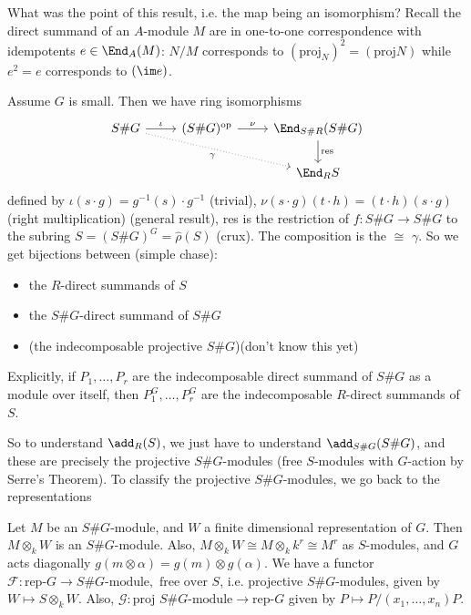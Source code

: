 What was the point of this result, i.e. the map being an isomorphism? Recall the direct summand of an $A$-module $M$ are in one-to-one correspondence with idempotents $e \in \End_A(M)$: $N/M$ corresponds to $(\text{proj}_N)^2= (\text{proj}N)$ while $e^2=e$ corresponds to $(\im e)$. 


\begin{cor}
Assume $G$ is small. Then we have ring isomorphisms 
	\[
	\begin{tikzcd}
	S\#G \arrow{r}{\iota} \arrow[dotted,swap]{rrd}{\gamma} & (S\#G)^{\text{op}} \arrow{r}{\nu} & \End_{S\#R}(S\#G) \arrow{d}{\text{res}} \\
	& & \End_R S
	\end{tikzcd}
	\]
defined by $\iota(s \cdot g)= g^{-1}(s) \cdot g^{-1}$ (trivial), $\nu(s \cdot g)(t \cdot h)= (t \cdot h)(s \cdot g)$ (right multiplication) (general result), res is the restriction of $f: S\#G \to S\#G$ to the subring $S= (S\#G)^G= \hat{\rho}(S)$ (crux). The composition is the $\cong$ $\gamma$. So we get bijections between (simple chase):
	\begin{itemize}
	\item the $R$-direct summands of $S$
	\item the $S\#G$-direct summand of $S\#G$
	\item (the indecomposable projective $S\#G$)(don't know this yet)
	\end{itemize}
Explicitly, if $P_1,\ldots,P_r$ are the indecomposable direct summand of $S\#G$ as a module over itself, then $P_1^G, \ldots, P_r^G$ are the indecomposable $R$-direct summands of $S$. 
\end{cor}


So to understand $\add_R(S)$, we just have to understand $\add_{S\#G}(S\#G)$, and these are precisely the projective $S\#G$-modules (free $S$-modules with $G$-action by Serre's Theorem). To classify the projective $S\#G$-modules, we go back to the representations


\begin{rem}
Let $M$ be an $S\#G$-module, and $W$ a finite dimensional representation of $G$. Then $M \otimes_k W$ is an $S\#G$-module. Also, $M \otimes_k W \cong M \otimes_k k^r \cong M^r$ as $S$-modules, and $G$ acts diagonally $g(m \otimes \alpha)= g(m) \otimes g(\alpha)$. We have a functor $\mathcal{F}: \text{rep-}G \to S\#G\text{-module}, \text{ free over }S$, i.e. projective $S\#G$-modules, given by $W \mapsto S \otimes_k W$. Also, $\mathcal{G}: \text{proj }S\#G\text{-module} \to \text{rep-}G$ given by $P \mapsto P/(x_1,\ldots,x_n)P$. 
\end{rem}


